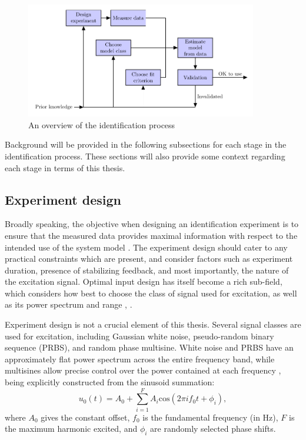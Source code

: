 \begin{figure}[h]
\centering
\includegraphics[width=0.9\textwidth]{Chapter2_SysIDandControl/IdentificationProcess.pdf}
\caption{An overview of the identification process}
\label{fig:IdentProcess}
\end{figure}

Background will be provided in the following subsections for each stage in the identification process. These sections will also provide some context regarding each stage in terms of this thesis.

\subsection{Experiment design} 

Broadly speaking, the objective when designing an identification experiment is to ensure that the measured data provides maximal information with respect to the intended use of the system model \cite{Gevers1986}. The experiment design should cater to any practical constraints which are present, and consider factors such as experiment duration, presence of stabilizing feedback, and most importantly, the nature of the excitation signal. Optimal input design has itself become a rich sub-field, which considers how best to choose the class of signal used for excitation, as well as its power spectrum and range \cite{Bombois2006}, \cite{Hildebrand2007}.

Experiment design is not a crucial element of this thesis. Several signal classes are used for excitation, including Gaussian white noise, pseudo-random binary sequence (PRBS), and random phase multisine. White noise and PRBS have an approximately flat power spectrum across the entire frequency band, while multisines allow precise control over the power contained at each frequency \cite{Schoukens2016}, being explicitly constructed from the sinusoid summation: 
\begin{equation}
u_0(t) = A_0 + \sum_{i=1}^{F} A_i \text{cos}(2 \pi i f_0 t + \phi_i),
\end{equation}
where $A_0$ gives the constant offset, $f_0$ is the fundamental frequency (in Hz), $F$ is the maximum harmonic excited, and $\phi_i$ are randomly selected phase shifts.

